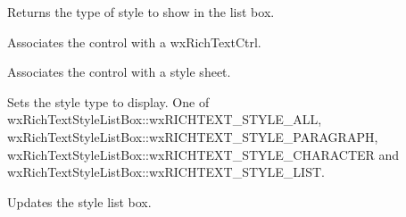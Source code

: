 
Returns the type of style to show in the list box.

\label{wxrichtextstylelistctrlsetrichtextctrl}


Associates the control with a wxRichTextCtrl.

\label{wxrichtextstylelistctrlsetstylesheet}


Associates the control with a style sheet.

\label{wxrichtextstylelistctrlsetstyletype}


Sets the style type to display. One of wxRichTextStyleListBox::wxRICHTEXT\_STYLE\_ALL, wxRichTextStyleListBox::wxRICHTEXT\_STYLE\_PARAGRAPH,
wxRichTextStyleListBox::wxRICHTEXT\_STYLE\_CHARACTER and wxRichTextStyleListBox::wxRICHTEXT\_STYLE\_LIST.

\label{wxrichtextstylelistctrlupdatestyles}


Updates the style list box. 

